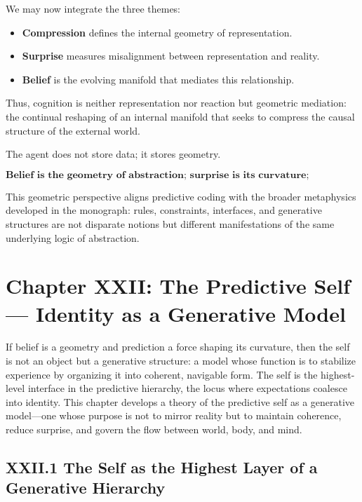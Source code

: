 \documentclass[12pt,letterpaper]{article}
\begin{document}
We may now integrate the three themes:

\begin{itemize}
    \item \textbf{Compression} defines the internal geometry of representation.
    \item \textbf{Surprise} measures misalignment between representation and reality.
    \item \textbf{Belief} is the evolving manifold that mediates this relationship.
\end{itemize}

Thus, cognition is neither representation nor reaction but geometric mediation: the continual reshaping of an internal manifold that seeks to compress the causal structure of the external world.

The agent does not store data; it stores geometry.

\[
\textbf{Belief is the geometry of abstraction; surprise is its curvature;  
compression is its governing principle.}
\]

This geometric perspective aligns predictive coding with the broader metaphysics developed in the monograph: rules, constraints, interfaces, and generative structures are not disparate notions but different manifestations of the same underlying logic of abstraction.

\newpage
\section{Chapter XXII: The Predictive Self — Identity as a Generative Model}

If belief is a geometry and prediction a force shaping its curvature, then the self is not an object but a generative structure: a model whose function is to stabilize experience by organizing it into coherent, navigable form. The self is the highest-level interface in the predictive hierarchy, the locus where expectations coalesce into identity. This chapter develops a theory of the predictive self as a generative model—one whose purpose is not to mirror reality but to maintain coherence, reduce surprise, and govern the flow between world, body, and mind.

\subsection{XXII.1 The Self as the Highest Layer of a Generative Hierarchy}
\end{document}
